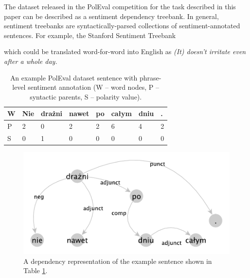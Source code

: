 \documentclass[10pt, a4paper]{article}
\begin{document}
The dataset released in the PolEval competition for the task described in this paper can be described as a sentiment dependency treebank. In general, sentiment treebanks are syntactically-parsed collections of sentiment-annotated sentences. For example, the Stanford Sentiment Treebank \cite{socher2013recursive}
 
which could be translated word-for-word into English as \textit{(It) doesn't irritate even after a whole day.}

\begin{table}[h]
 \begin{center}
\begin{tabular}{|l| l l l l l l l|}
      \hline
      W & Nie & drażni & nawet & po & całym & dniu & . \\
      \hline
      P & 2 & 0 & 2 & 2 & 6 & 4 & 2 \\
      \hline
      S & 0 & 1 & 0 & 0 & 0 & 0 & 0 \\
      \hline
\end{tabular}
\caption{An example PolEval dataset sentence with phrase-level sentiment annotation (W -- word nodes, P -- syntactic parents, S -- polarity value).}
\label{tab:nie_drazni_1}
 \end{center}
\end{table}



\begin{figure}
  \includegraphics[width=\linewidth]{imgs/nie_drazni.pdf}
  \caption{A dependency representation of the example sentence shown in Table \ref{tab:nie_drazni_1}.}
  \label{fig:boat1}
\end{figure}
\end{document}
